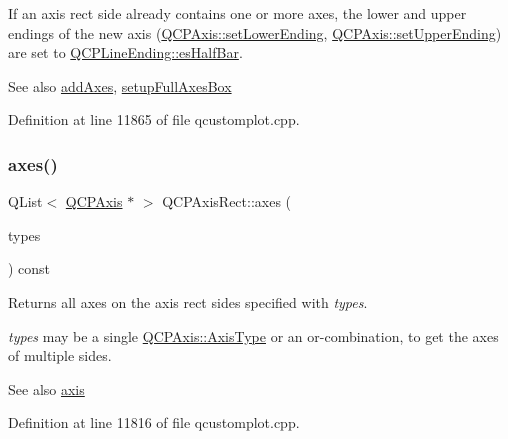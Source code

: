 If an axis rect side already contains one or more axes, the lower and upper endings of the new axis (\hyperlink{class_q_c_p_axis_a08af1c72db9ae4dc8cb8a973d44405ab}{Q\+C\+P\+Axis\+::set\+Lower\+Ending}, \hyperlink{class_q_c_p_axis_a69119b892fc306f651763596685aa377}{Q\+C\+P\+Axis\+::set\+Upper\+Ending}) are set to \hyperlink{class_q_c_p_line_ending_a5ef16e6876b4b74959c7261d8d4c2cd5a126c390f0c359fcd8df1fc5e38d26d5b}{Q\+C\+P\+Line\+Ending\+::es\+Half\+Bar}.

\begin{DoxySeeAlso}{See also}
\hyperlink{class_q_c_p_axis_rect_a792e1f3d9cb1591fca135bb0de9b81fc}{add\+Axes}, \hyperlink{class_q_c_p_axis_rect_a5fa906175447b14206954f77fc7f1ef4}{setup\+Full\+Axes\+Box} 
\end{DoxySeeAlso}


Definition at line 11865 of file qcustomplot.\+cpp.

\mbox{\label{class_q_c_p_axis_rect_a8db4722cb93e9c4a6f0d91150c200867}} 
\subsubsection{\texorpdfstring{axes()}{axes()}\hspace{0.1cm}{\footnotesize\ttfamily [1/2]}}
{\footnotesize\ttfamily Q\+List$<$ \hyperlink{class_q_c_p_axis}{Q\+C\+P\+Axis} $\ast$ $>$ Q\+C\+P\+Axis\+Rect\+::axes (\begin{DoxyParamCaption}\item[{Q\+C\+P\+Axis\+::\+Axis\+Types}]{types }\end{DoxyParamCaption}) const}

Returns all axes on the axis rect sides specified with {\itshape types}.

{\itshape types} may be a single \hyperlink{class_q_c_p_axis_ae2bcc1728b382f10f064612b368bc18a}{Q\+C\+P\+Axis\+::\+Axis\+Type} or an {\ttfamily or}-\/combination, to get the axes of multiple sides.

\begin{DoxySeeAlso}{See also}
\hyperlink{class_q_c_p_axis_rect_a583ae4f6d78b601b732183f6cabecbe1}{axis} 
\end{DoxySeeAlso}


Definition at line 11816 of file qcustomplot.\+cpp.

\mbox{\label{class_q_c_p_axis_rect_a11657b8faebe9677180860e8057ede26}} 
